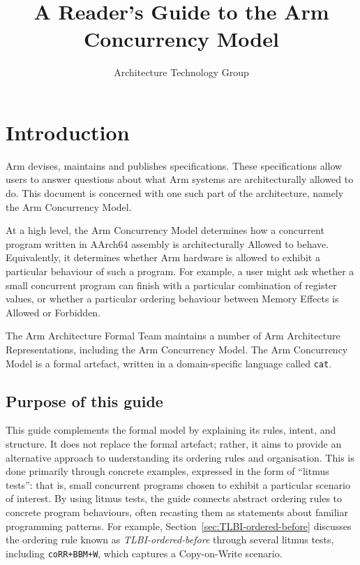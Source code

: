 \documentclass{book}
\title{A Reader's Guide to the Arm Concurrency Model}
\author{Architecture Technology Group}
\begin{document}
\maketitle

\tableofcontents{}

\chapter{Introduction}

Arm devises, maintains and publishes specifications. These specifications allow
users to answer questions about what Arm systems are architecturally allowed to
do. This document is concerned with one such part of the architecture, namely
the Arm Concurrency Model.

At a high level, the Arm Concurrency Model determines how a concurrent program
written in AArch64 assembly is architecturally Allowed to behave. Equivalently,
it determines whether Arm hardware is allowed to exhibit a particular behaviour
of such a program. For example, a user might ask whether a small concurrent
program can finish with a particular combination of register values, or whether
a particular ordering behaviour between Memory Effects is Allowed or Forbidden.

The Arm Architecture Formal Team maintains a number of Arm Architecture
Representations, including the Arm Concurrency Model. The Arm Concurrency Model
is a formal artefact, written in a domain-specific language called
\texttt{cat}.

\section{Purpose of this guide}

This guide complements the formal model by explaining its rules, intent, and
structure. It does not replace the formal artefact; rather, it aims to provide
an alternative approach to understanding its ordering rules and organisation.
This is done primarily through concrete examples, expressed in the form of
``litmus tests'': that is, small concurrent programs chosen to exhibit a
particular scenario of interest. By using litmus tests, the guide connects
abstract ordering rules to concrete program behaviours, often recasting them as
statements about familiar programming patterns. For example,
Section~\ref{sec:TLBI-ordered-before} discusses the ordering rule known as
\textit{TLBI-ordered-before} through several litmus tests, including
\texttt{coRR+BBM+W}, which captures a Copy-on-Write scenario.
\end{document}
